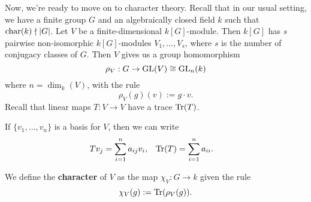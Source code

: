 Now, we're ready to move on to character theory. Recall that in our 
usual setting, we have a finite group $G$ and an algebraically closed field 
$k$ such that $\operatorname{char}(k) \nmid |G|$. Let $V$ be a finite-dimensional $k[G]$-module. 
Then $k[G]$ has $s$ pairwise non-isomorphic $k[G]$-modules $V_1, \dots, V_s$, 
where $s$ is the number of conjugacy classes of $G$. Then $V$ gives us a 
group homomorphism 
\[ \rho_V : G \to \operatorname{GL}(V) \cong \operatorname{GL}_n(k) \] 
where $n = \dim_k(V)$, with the rule 
\[ \rho_V(g)(v) := g \cdot v. \] 
Recall that linear maps $T : V \to V$ have a trace $\operatorname{Tr}(T)$. 

\begin{remark}
    If $\{v_1, \dots, v_n\}$ is a basis for $V$, then we can write 
    \begin{align*} 
        Tv_j &= \sum_{i=1}^n a_{ij} v_i, & \operatorname{Tr}(T) &= \sum_{i=1}^n a_{ii}. 
    \end{align*}
\end{remark}

\begin{defn}
    We define the {\bf character} of $V$ as the map $\chi_V : G \to k$
    given the rule 
    \[ \chi_V(g) := \operatorname{Tr}(\rho_V(g)). \] 
\end{defn}

